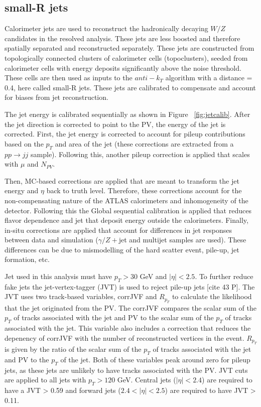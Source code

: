 \subsection{small-R jets}
Calorimeter jets are used to reconstruct the hadronically decaying $W/Z$ candidates in the resolved analysis. These jets are less boosted and therefore spatially separated and reconstructed separately. These jets are constructed from topologically connected clusters of calorimeter cells (topoclusters), seeded from calorimeter cells with energy deposits significantly above the noise threshold.  These cells are then used as inputs to the $anti-k_{T}$ algorithm \cite{antikt} with a distance = 0.4, here called small-R jets. These jets are calibrated to compensate and account for biases from jet reconstruction. 

The jet energy is calibrated sequentially as shown in Figure ~\ref{fig:jetcalib}. After the jet direction is corrected to point to the PV, the energy of the jet is corrected. First, the jet energy is corrected to account for pileup contributions based on the $p_{T}$ and area of the jet (these corrections are extracted from a $pp \rightarrow jj$ sample). Following this, another pileup correction is applied that scales with $\mu$ and $N_{PV}$. 

Then, MC-based corrections are applied that are meant to transform the jet energy and $\eta$ back to truth level. Therefore, these corrections account for the non-compensating nature of the ATLAS calorimeters and inhomogeneity of the detector. Following this the Global sequential calibration is applied that reduces flavor dependence and jet that deposit energy outside the calorimeters. Finally, in-situ corrections are applied that account for differences in jet responses between data and simulation ($\gamma /Z+$jet and multijet samples are used). These differences can be due to mismodelling of the hard scatter event, pile-up, jet formation, etc. 

Jet used in this analysis must have $p_{T} > 30$ GeV and $|\eta| < 2.5$. To further reduce fake jets the jet-vertex-tagger (JVT) is used to reject pile-up jets [cite 43 P]. The JVT  uses two track-based variables, corrJVF and $R_{p_{T}}$ to calculate the likelihood that the jet originated from the PV. The corrJVF compares the scalar sum of the $p_{T}$ of tracks associated with the jet and PV to the scalar sum of the $p_{T}$ of tracks associated with the jet. This variable also includes a correction that reduces the depenency of corrJVF with the number of reconstructed vertices in the event. $R_{p_{T}}$ is given by the ratio of the scalar sum of the $p_{T}$ of tracks associated with the jet and PV to the $p_{T}$ of the jet. Both of these variables peak around zero for pileup jets, as these jets are unlikely to have tracks associated with the PV. JVT cuts are applied to all jets with $p_{T} > 120$ GeV. Central jets ($|\eta| < 2.4$) are required to have a JVT > 0.59 and forward jets ($2.4<|\eta| < 2.5$) are required to have JVT > 0.11. 

